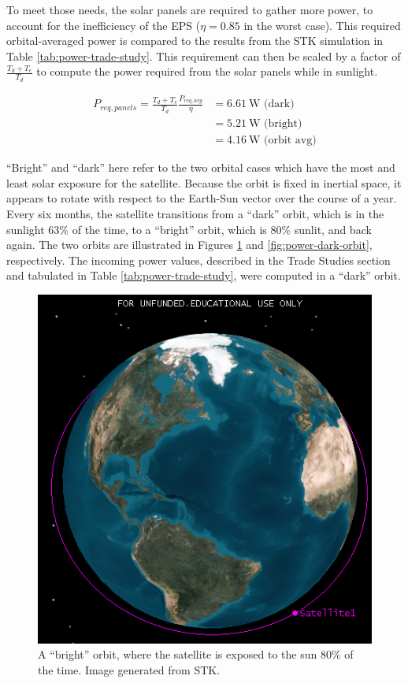\documentclass[12pt]{article}
\begin{document}
To meet those needs, the solar panels are required to gather more power, to account for the inefficiency of the EPS ($\eta = 0.85$ in the worst case\cite[p.~9]{EPS-manual}).  This required orbital-averaged power is compared to the results from the STK simulation in Table \ref{tab:power-trade-study}.  This requirement can then be scaled by a factor of $\frac{T_d + T_e}{T_d}$ to compute the power required from the solar panels while in sunlight.

\begin{align}
P_{req,panels} = \frac{T_d + T_e}{T_d}\frac{P_{req,avg}}{\eta} &= 6.61 \ \text{W (dark)}\nonumber\\
&= 5.21 \ \text{W (bright)}\nonumber\\
&= 4.16 \ \text{W (orbit avg)}
\label{eq:power-required-panels}
\end{align}

``Bright'' and ``dark'' here refer to the two orbital cases which have the most and least solar exposure for the satellite.  Because the orbit is fixed in inertial space, it appears to rotate with respect to the Earth-Sun vector over the course of a year.  Every six months, the satellite transitions from a ``dark'' orbit, which is in the sunlight 63\% of the time, to a ``bright'' orbit, which is 80\% sunlit, and back again.  The two orbits are illustrated in Figures \ref{fig:power-bright-orbit} and \ref{fig:power-dark-orbit}, respectively.  The incoming power values, described in the Trade Studies section and tabulated in Table \ref{tab:power-trade-study}, were computed in a ``dark'' orbit.

\begin{figure}[ht]%
\centering
\includegraphics{images/power-bright-orbit}%
\caption{A ``bright'' orbit, where the satellite is exposed to the sun 80\% of the time.  Image generated from STK.}%
\label{fig:power-bright-orbit}%
\end{figure}
\end{document}
